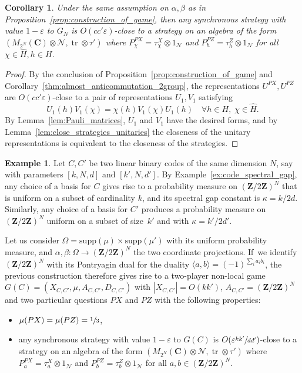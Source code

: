\documentclass[10pt]{amsart}
\theoremstyle{plain}
\newtheorem{corollary}[theorem]{Corollary}
\theoremstyle{definition}
\newtheorem{example}[theorem]{Example}
\newcommand{\C}{\mathbf{C}}
\newcommand{\Z}{\mathbf{Z}}
\newcommand{\cN}{\mathcal{N}}
\DeclareMathOperator{\tr}{tr}
\begin{document}
\begin{corollary}\label{cor:pauli_from_good_strategy}
Under the same assumption on $\alpha,\beta$ as in Proposition~\ref{prop:construction_of_game}, then any synchronous strategy with value $1-\varepsilon$ to $G_N$ is $O(cc'\varepsilon)$-close to a strategy on an algebra of the form $(M_{2^N}(\C)\otimes \cN,\mathrm{\tr}\otimes \tau')$ where $P^{PX}_\chi = \tau^X_\chi\otimes 1_\cN$ and $P^{PZ}_h = \tau^Z_h\otimes 1_\cN$ for all $\chi \in\hat H, h\in H$.
\end{corollary}

\begin{proof}
By the conclusion of Proposition~\ref{prop:construction_of_game} and Corollary~\ref{thm:almost_anticommutation_2group}, the representations $U^{PX},U^{PZ}$ are $O(cc'\varepsilon)$-close to a pair of representations $U_1,V_1$ satisfying
\[
U_1(h) V_1(\chi) = \chi(h) V_1(\chi) U_1(h)\quad\forall h \in H,\;\chi \in \hat H.
\]
By Lemma~\ref{lem:Pauli_matrices}, $U_1$ and $V_1$ have the desired forms, and by Lemma~\ref{lem:close_strategies_unitaries} the closeness of the unitary representations is equivalent to the closeness of the strategies.
\end{proof}

\begin{example}\label{ex:game_from_code} Let $C,C'$ be two linear binary codes of the same dimension $N$, say with parameters $[k,N,d]$ and $[k',N,d']$. By Example~\ref{ex:code_spectral_gap}, any choice of a basis for $C$ gives rise to a probability measure on $(\Z/2\Z)^N$ that is uniform on a subset of cardinality $k$, and its spectral gap constant is $\kappa = k/2d$. Similarly, any choice of a basis for $C'$ produces a probability measure on $(\Z/2\Z)^N$ uniform on a subset of size~$k'$ and with $\kappa = k'/2d'$.

Let us consider $\Omega = \mathrm{supp}(\mu)\times \mathrm{supp}(\mu')$ with its uniform probability measure, and $\alpha,\beta:\Omega\to (\Z/2\Z)^N$ the two coordinate projections. If~we identify $(\Z/2\Z)^N$ with its Pontryagin dual for the duality $\langle a,b\rangle=(-1)^{\sum_i a_i b_i}$, the previous construction therefore gives rise to a two-player non-local game $G(C)=(X_{C,C'},\mu,A_{C,C'},D_{C,C'})$ with $|X_{C,C'}|=O(kk')$, $A_{C,C'}=(\Z/2\Z)^N$ and two particular questions $PX$ and $PZ$ with the following properties:
\begin{itemize}
\item $\mu(PX)=\mu(PZ)=\sfrac 1 3$,
\item any synchronous strategy with value $1-\varepsilon$ to $G(C)$ is $O(\varepsilon\sfrac{kk'}{dd'})$-close to a strategy on an algebra of the form $(M_{2^N}(\C)\otimes \cN,\mathrm{\tr}\otimes \tau')$ where $P^{PX}_a = \tau^X_a\otimes 1_\cN$ and $P^{PZ}_b = \tau^Z_b\otimes 1_\cN$ for all $a,b\in (\Z/2\Z)^N$.
\end{itemize}
\end{example}
\end{document}
